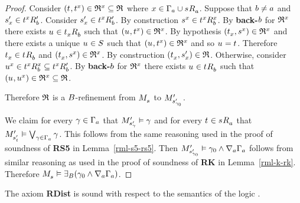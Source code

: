 \begin{proof}
Consider $(\kStateT, \kStateT[x]) \in \refinement^x \subseteq \refinement$ where $x \in \Gamma_\agentA \cup \kSuccessorsA{\kStateS}$.
Suppose that $\agentB \neq \agentA$ and $\kStateSP_x \in \kSuccessorsPB{\kStateT[x]}$.
Consider $\kStateSP_x \in \kSuccessorsPB{\kStateT[x]}$.
By construction $\kStateS[x] \in \kSuccessorsB[x]{\kStateT[x]}$.
By {\bf back-$\agentB$} for $\refinement^x$ there exists $\kStateU \in \kSuccessorsB{\kStateT_x}$ such that $(\kStateU, \kStateT[x]) \in \refinement^x$.
By hypothesis $(\kStateT_x, \kStateS[x]) \in \refinement^x$ and there exists a unique $\kStateU \in \kStates$ such that $(\kStateU, \kStateT[x]) \in \refinement^x$ and so $\kStateU = \kStateT$.
Therefore $\kStateT_x \in \kSuccessorsB{\kStateT}$ and $(\kStateT_x, \kStateS[x]) \in \refinement^x$.
By construction $(\kStateT_x, \kStateSP_x) \in \refinement$.
Otherwise, consider $\kStateU[x] \in \kSuccessorsB[x]{\kStateT[x]} \subseteq \kSuccessorsPB{\kStateT[x]}$.
By {\bf back-$\agentB$} for $\refinement^x$ there exists $\kStateU \in \kSuccessorsB{\kStateT}$ such that $(\kStateU, \kStateU[x]) \in \refinement^x \subseteq \refinement$.

Therefore $\refinement$ is a $\agentsB$-refinement from $\kPModel{\kStateS}$ to $\kPModelP{\kStateSP_{\gamma_0}}$.

We claim for every $\gamma \in \Gamma_\agentA$ that $\kPModelP{\kStateSP_\gamma} \entails \gamma$ and for every $\kStateT \in \kSuccessorsA{\kStateS}$ that $\kPModelP{\kStateSP_{\kStateT}} \entails \bigvee_{\gamma \in \Gamma_\agentA} \gamma$.
This follows from the same reasoning used in the proof of soundness of {\bf RS5} in Lemma~\ref{rml-s5-rs5}.
Then $\kPModelP{\kStateSP_{\gamma_0}} \entails \gamma_0 \land \coversA \Gamma_\agentA$ follows from similar reasoning as used in the proof of soundness of {\bf RK} in Lemma~\ref{rml-k-rk}.
Therefore $\kPModel{\kStateS} \entails \somerefsBs (\gamma_0 \land \coversA \Gamma_\agentA)$.
\end{proof}

\begin{lemma}
The axiom {\bf RDist} is sound with respect to the semantics of the logic \logicRmlS{}.
\end{lemma}

